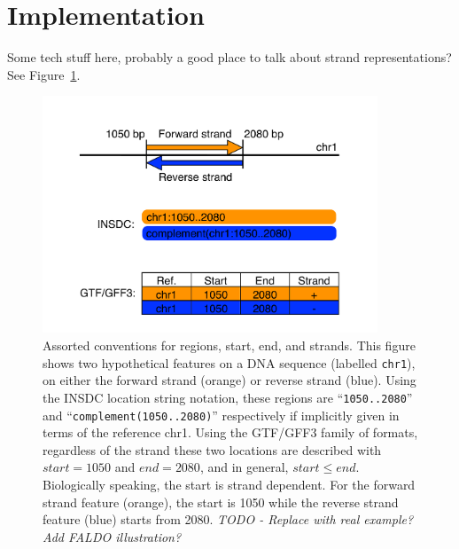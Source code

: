 \section*{Implementation}
Some tech stuff here, probably a good place to talk about strand representations?
See Figure~\ref{fig:strands}.

\begin{figure}[p]
\begin{center}
\includegraphics[width=10cm]{figures/figure-strand.pdf}
\end{center}
\caption{Assorted conventions for regions, start, end, and strands.
This figure shows two hypothetical features on a DNA sequence
(labelled \texttt{chr1}), on either the forward strand (orange) or
reverse strand (blue).
Using the INSDC location string notation, these regions are
``\texttt{1050..2080}'' and ``\texttt{complement(1050..2080)}''
respectively if implicitly given in terms of the reference chr1.
Using the GTF/GFF3 family of formats, regardless of the
strand these two locations are described with $start = 1050$
and $end = 2080$, and in general, $start \leq end$.
Biologically speaking, the start is strand dependent.
For the forward strand feature (orange), the start is 1050
while the reverse strand feature (blue) starts from 2080.
\textit{TODO - Replace with real example? Add FALDO illustration?}
}
\label{fig:strands}
\end{figure}
